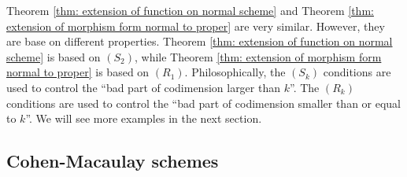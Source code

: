     \begin{remark}\label{rmk: extension of function on normal scheme and extension of morphism form normal to proper}
        Theorem \ref{thm: extension of function on normal scheme} and Theorem \ref{thm: extension of morphism form normal to proper} are very similar.
        However, they are base on different properties.
        Theorem \ref{thm: extension of function on normal scheme} is based on $(S_2)$, while Theorem \ref{thm: extension of morphism form normal to proper} is based on $(R_1)$.
        Philosophically, the $(S_k)$ conditions are used to control the ``bad part of codimension larger than $k$''.
        The $(R_k)$ conditions are used to control the ``bad part of codimension smaller than or equal to $k$''.
        We will see more examples in the next section.
    \end{remark}




\subsection{Cohen-Macaulay schemes}






